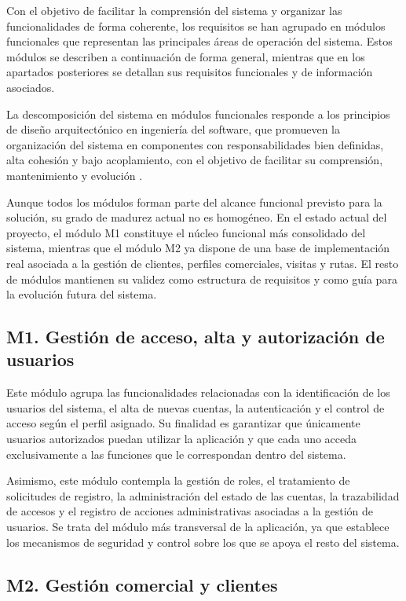 Con el objetivo de facilitar la comprensión del sistema y organizar las funcionalidades de forma coherente, los requisitos se han agrupado en módulos funcionales que representan las principales áreas de operación del sistema. Estos módulos se describen a continuación de forma general, mientras que en los apartados posteriores se detallan sus requisitos funcionales y de información asociados.

La descomposición del sistema en módulos funcionales responde a los principios de diseño arquitectónico en ingeniería del software, que promueven la organización del sistema en componentes con responsabilidades bien definidas, alta cohesión y bajo acoplamiento, con el objetivo de facilitar su comprensión, mantenimiento y evolución \citep[Ch.~6--7]{sommerville}.

Aunque todos los módulos forman parte del alcance funcional previsto para la solución, su grado de madurez actual no es homogéneo. En el estado actual del proyecto, el módulo M1 constituye el núcleo funcional más consolidado del sistema, mientras que el módulo M2 ya dispone de una base de implementación real asociada a la gestión de clientes, perfiles comerciales, visitas y rutas. El resto de módulos mantienen su validez como estructura de requisitos y como guía para la evolución futura del sistema.

\subsection{M1. Gestión de acceso, alta y autorización de usuarios}

Este módulo agrupa las funcionalidades relacionadas con la identificación de los usuarios del sistema, el alta de nuevas cuentas, la autenticación y el control de acceso según el perfil asignado. Su finalidad es garantizar que únicamente usuarios autorizados puedan utilizar la aplicación y que cada uno acceda exclusivamente a las funciones que le correspondan dentro del sistema.

Asimismo, este módulo contempla la gestión de roles, el tratamiento de solicitudes de registro, la administración del estado de las cuentas, la trazabilidad de accesos y el registro de acciones administrativas asociadas a la gestión de usuarios. Se trata del módulo más transversal de la aplicación, ya que establece los mecanismos de seguridad y control sobre los que se apoya el resto del sistema.

\subsection{M2. Gestión comercial y clientes}

